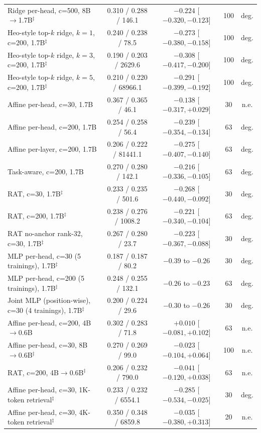 \documentclass[10pt]{article}
\begin{document}
\begin{table}[t]
\begin{tabular}{lcccc}
Ridge per-head, c=500, 8B$\to$1.7B$^\ddagger$ & 0.310 / 0.288 / 146.1 & $-0.224$ [$-0.320, -0.123$] & 100 & deg. \\
Heo-style top-$k$ ridge, $k{=}1$, c=200, 1.7B$^\ddagger$ & 0.240 / 0.238 / 78.5 & $-0.273$ [$-0.380, -0.158$] & 100 & deg. \\
Heo-style top-$k$ ridge, $k{=}3$, c=200, 1.7B$^\ddagger$ & 0.190 / 0.203 / 2629.6 & $-0.308$ [$-0.417, -0.200$] & 100 & deg. \\
Heo-style top-$k$ ridge, $k{=}5$, c=200, 1.7B$^\ddagger$ & 0.210 / 0.220 / 68966.1 & $-0.291$ [$-0.399, -0.192$] & 100 & deg. \\
Affine per-head, c=30, 1.7B & 0.367 / 0.365 / 46.1 & $-0.138$ [$-0.317, +0.029$] & 30 & n.e. \\
Affine per-head, c=200, 1.7B & 0.254 / 0.258 / 56.4 & $-0.239$ [$-0.354, -0.134$] & 63 & deg. \\
Affine per-layer, c=200, 1.7B & 0.206 / 0.222 / 81441.1 & $-0.275$ [$-0.407, -0.140$] & 63 & deg. \\
Task-aware, c=200, 1.7B & 0.270 / 0.280 / 142.1 & $-0.216$ [$-0.336, -0.105$] & 63 & deg. \\
RAT, c=30, 1.7B$^\ddagger$ & 0.233 / 0.235 / 501.6 & $-0.268$ [$-0.440, -0.092$] & 30 & deg. \\
RAT, c=200, 1.7B$^\ddagger$ & 0.238 / 0.276 / 1008.2 & $-0.221$ [$-0.340, -0.104$] & 63 & deg. \\
RAT no-anchor rank-32, c=30, 1.7B$^\ddagger$ & 0.267 / 0.280 / 23.7 & $-0.223$ [$-0.367, -0.088$] & 30 & deg. \\
MLP per-head, c=30 (5 trainings), 1.7B$^\ddagger$ & 0.187 / 0.187 / 80.2 & $-0.39$ to $-0.26$ & 30 & deg. \\
MLP per-head, c=200 (5 trainings), 1.7B$^\ddagger$ & 0.248 / 0.255 / 132.1 & $-0.26$ to $-0.23$ & 63 & deg. \\
Joint MLP (position-wise), c=30 (4 trainings), 1.7B$^\ddagger$ & 0.200 / 0.224 / 29.6 & $-0.30$ to $-0.26$ & 30 & deg. \\
Affine per-head, c=200, 4B$\to$0.6B & 0.302 / 0.283 / 71.8 & $+0.010$ [$-0.081, +0.102$] & 63 & n.e. \\
Affine per-head, c=30, 8B$\to$0.6B$^\ddagger$ & 0.270 / 0.269 / 99.0 & $-0.023$ [$-0.104, +0.064$] & 100 & n.e. \\
RAT, c=200, 4B$\to$0.6B$^\ddagger$ & 0.206 / 0.232 / 790.0 & $-0.041$ [$-0.120, +0.038$] & 63 & n.e. \\
Affine per-head, c=30, 1K-token retrieval$^\ddagger$ & 0.233 / 0.232 / 6554.1 & $-0.285$ [$-0.534, -0.025$] & 30 & deg. \\
Affine per-head, c=30, 4K-token retrieval$^\ddagger$ & 0.350 / 0.348 / 6859.8 & $-0.035$ [$-0.380, +0.313$] & 20 & n.e. \\
\bottomrule
\end{tabular}
\end{table}
\end{document}
